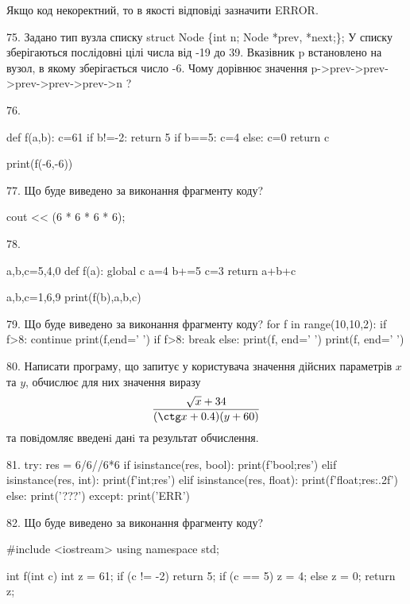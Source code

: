 \documentclass[11pt]{article}
\begin{document}
Якщо код некоректний, то в якості відповіді зазначити ERROR.




75. 
Задано тип вузла списку
struct Node \{int n; Node *prev, *next;\};
У списку зберігаються послідовні цілі числа від -19 до 39. Вказівник p встановлено на вузол, в якому зберігається число -6.
Чому дорівнює значення p->prev->prev->prev->prev->prev->n ?

76. 

def f(a,b):
    c=61
    if b!=-2:
        return 5
    if b==5:
         c=4
    else: 
        c=0
    return c

print(f(-6,-6))

77. Що буде виведено за виконання фрагменту коду?

cout << (6 * 6 * 6 * 6);


78. 

a,b,c=5,4,0
def f(a):
global c    a=4
    b+=5
    c=3
    return a+b+c

a,b,c=1,6,9
print(f(b),a,b,c)


79. Що буде виведено за виконання фрагменту коду?
for f in range(10,10,2):
    if f>8:
        continue
        print(f,end=' ')
    if f>8:
        break
else:
    print(f, end=' ')
print(f, end=' ')


80. 
Написати програму, що запитує у користувача значення дійсних параметрів $x$ та $y$, обчислює для них значення виразу 
$$\frac{\sqrt x + 34}{(\ctg x + 0.4) (y + 60)}$$ 
та повiдомляє введенi данi та результат обчислення.



81. 
try:
    res = 6/6//6*6
    if isinstance(res, bool):
        print(f'bool;{res}')
    elif isinstance(res, int):
        print(f'int;{res}')
    elif isinstance(res, float):
        print(f'float;{res:.2f}')
    else:
        print('???')
except:
    print('ERR')


82. Що буде виведено за виконання фрагменту коду?

#include <iostream>
using namespace std;

int f(int c){
    int z = 61;
    if (c != -2) 
        return 5;
    if (c == 5)
         z = 4;
    else
         z = 0;
    return z;
}
\end{document}
